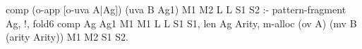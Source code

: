 \begin{elpicode}
  comp (o-app [o-uva A|Ag]) (uva B Ag1) M1 M2 L L S1 S2 :-
    pattern-fragment Ag, !,
      fold6 comp Ag Ag1 M1 M1 L L S1 S1,
      len Ag Arity, 
      m-alloc (ov A) (mv B (arity Arity)) M1 M2 S1 S2.
\end{elpicode}
